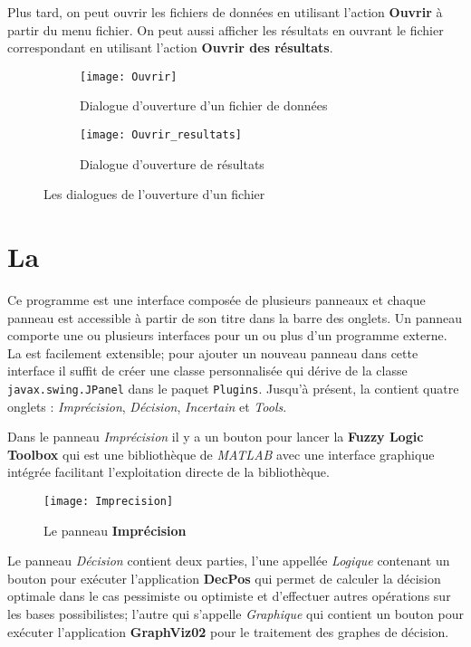 Plus tard, on peut ouvrir les fichiers de données en utilisant l'action \textbf{Ouvrir} à partir du menu fichier. On
peut aussi afficher les résultats en ouvrant le fichier correspondant en utilisant l'action \textbf{Ouvrir des résultats}.

\begin{figure}[H]
\begin{subfigure}{0.49\textwidth}
\texttt{[image: Ouvrir]}
\caption{Dialogue d'ouverture d'un fichier de données}
\end{subfigure}
\hfill
\begin{subfigure}{0.49\textwidth}
\texttt{[image: Ouvrir\_resultats]}
\caption{Dialogue d'ouverture de résultats}
\end{subfigure}
\caption{Les dialogues de l'ouverture d'un fichier}
\end{figure}

\section{La \platformename}

Ce programme est une interface composée de plusieurs panneaux et chaque panneau est accessible
à partir de son titre dans la barre des onglets. Un panneau comporte une ou plusieurs interfaces pour
un ou plus d'un programme externe.  La \platformename est facilement extensible; pour ajouter un nouveau
panneau dans cette interface il suffit de créer une classe personnalisée qui dérive de la classe
\mbox{\texttt{javax.swing.JPanel}} dans le paquet \texttt{Plugins}. Jusqu'à présent, la \platformename
contient quatre onglets : \textit{Imprécision}, \textit{Décision}, \textit{Incertain}
et \textit{Tools}.

Dans le panneau \textit{Imprécision} il y a un bouton pour lancer la \textbf{Fuzzy Logic Toolbox} qui est une
bibliothèque de \textit{MATLAB} avec une interface graphique intégrée facilitant l'exploitation directe
de la bibliothèque.

\begin{figure}[H]
\centering
\texttt{[image: Imprecision]}
\caption{Le panneau \textbf{Imprécision}}
\end{figure}

Le panneau \textit{Décision} contient deux parties, l'une appellée \textit{Logique}
contenant un bouton pour exécuter l'application \textbf{DecPos} qui permet de calculer la décision optimale dans
le cas pessimiste ou optimiste et d'effectuer autres opérations sur les bases possibilistes; l'autre qui
s'appelle \textit{Graphique} qui contient un bouton pour exécuter l'application \textbf{GraphViz02} pour
le traitement des graphes de décision.

